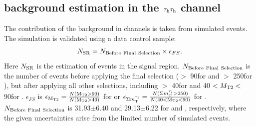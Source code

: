 \subsection{\texorpdfstring{\wjets background estimation in the $\tau_{\rm h}\tau_{\rm h}$ channel}{W+jets background estimation in the tau-tau channel}}
\label{sect:bkgW}
The contribution of the \wjets background in \tauTau channels is taken from simulated events. The simulation is validated using a data control sample: 
\begin{equation}
N_{\rm SR} = N_{\rm Before~Final~Selection} \times \epsilon_{FS}.
\end{equation}
Here $N_{\rm SR}$ is the estimation of \wjets events in the signal region. $N_{\rm Before~Final~Selection}$ is the number of 
\wjets events before applying the final selection (\mttwo $>$ 90\GeV for \binone and \SumMT $>$ 250\GeV for \bintwo), but after applying all other selections, including \mttwo $>$ 40\GeV for \binone and 40 $<{M_{\rm T2}}<$ 90\GeV for \bintwo.  
$\epsilon_{FS}$ is $\epsilon_{ \rm M_{T2}}= \frac{N (\rm M_{T2}>90)}{N (\rm M_{T2}>40)}$ for \binone or  
$\epsilon_{\Sigma m_{\rm T}^{\tau_i}}=\frac{N (\Sigma m_{\rm T}^{\tau_i}>250)}{N(40<\rm M_{T2}<90)}$ for \bintwo. $N_{\rm Before~Final~Selection}$ is 31.93$\pm$6.40 and 29.13$\pm$6.22 for \binone and
\bintwo, respectively, where the given uncertainties arise from the limited number of simulated events. 


